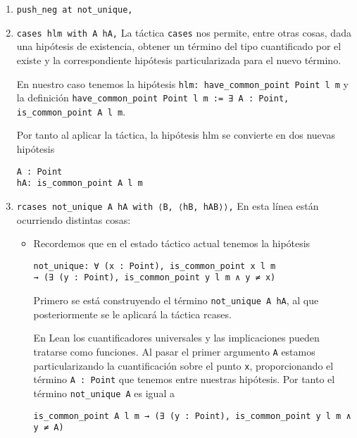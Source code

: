 \begin{enumerate}[label=L.\arabic*, topsep=0mm]
	\item \lstinline{push_neg at not_unique,}

	\item \lstinline{cases hlm with A hA,} La táctica \lstinline{cases} nos
	      permite, entre otras cosas, dada una hipótesis de existencia, obtener un
	      término del tipo cuantificado por el existe y la correspondiente hipótesis
	      particularizada para el nuevo término.

	      En nuestro caso tenemos la hipótesis \lstinline{hlm: have_common_point Point l m} y la definición
	      \lstinline{have_common_point Point l m := ∃ A : Point, is_common_point A l m}.

	      Por tanto al aplicar la táctica, la hipótesis hlm se convierte en dos
	      nuevas hipótesis
	      \begin{lstlisting}
A : Point 
hA: is_common_point A l m
\end{lstlisting}

	\item \lstinline{rcases not_unique A hA with ⟨B, ⟨hB, hAB⟩⟩,} En esta línea
	      están ocurriendo distintas cosas:
	      \begin{itemize}
		      \item Recordemos que en el estado táctico actual tenemos la hipótesis
		            \begin{lstlisting}
not_unique: ∀ (x : Point), is_common_point x l m 
→ (∃ (y : Point), is_common_point y l m ∧ y ≠ x) 
\end{lstlisting}

		            Primero se está construyendo el término \lstinline{not_unique A hA},
		            al que posteriormente se le aplicará la táctica {rcases}.

		            En Lean los cuantificadores universales y las implicaciones pueden
		            tratarse como funciones. Al pasar el primer argumento \lstinline{A}
		            estamos particularizando la cuantificación sobre el punto
		            \lstinline{x}, proporcionando el término \lstinline{A : Point} que
		            tenemos entre nuestras hipótesis. Por tanto el término
		            \lstinline{not_unique A} es igual a
		            \begin{lstlisting}
is_common_point A l m → (∃ (y : Point), is_common_point y l m ∧ y ≠ A)
\end{lstlisting}


\end{itemize}
\end{enumerate}
